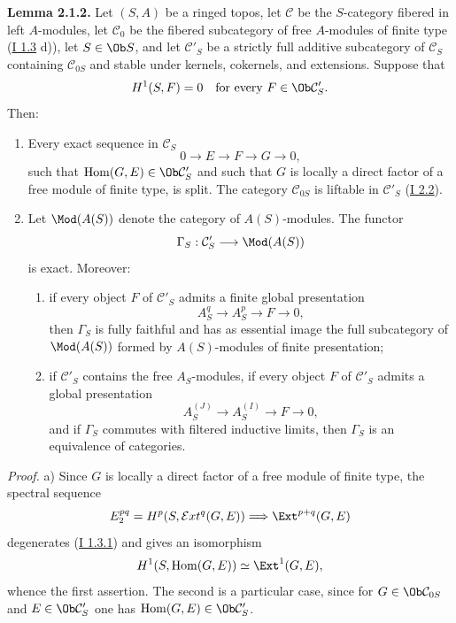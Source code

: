 \textbf{Lemma 2.1.2.} Let $(S,A)$ be a ringed topos, let $\mathcal C$ be the $S$-category fibered in left $A$-modules, let $\mathcal C_0$ be the fibered subcategory of free $A$-modules of finite type (\hyperlink{sga6.e01.sec.1.3}{I 1.3} d)), let $S\in\Ob S$, and let $\mathcal C'_S$ be a strictly full additive subcategory of $\mathcal C_S$ containing $\mathcal C_{0S}$ and stable under kernels, cokernels, and extensions. Suppose that
\[
H^1(S,F)=0\quad\text{for every }F\in\Ob\mathcal C'_S.
\]
Then:
\begin{enumerate}[label=\alph*)]
\item Every exact sequence in $\mathcal C_S$
\[
0\longrightarrow E\longrightarrow F\longrightarrow G\longrightarrow0,
\]
such that $\operatorname{Hom}(G,E)\in\Ob\mathcal C'_S$ and such that $G$ is locally a direct factor of a free module of finite type, is split. The category $\mathcal C_{0S}$ is liftable in $\mathcal C'_S$ (\hyperlink{sga6.e01.prop.2-2}{I 2.2}).
\item Let $\Mod(A(S))$ denote the category of $A(S)$-modules. The functor
\[
\Gamma_S:\mathcal C'_S\longrightarrow\Mod(A(S))
\]
is exact. Moreover:
\begin{enumerate}[label=(\roman*)]
\item if every object $F$ of $\mathcal C'_S$ admits a finite global presentation
\[
A_S^q\longrightarrow A_S^p\longrightarrow F\longrightarrow0,
\]
then $\Gamma_S$ is fully faithful and has as essential image the full subcategory of $\Mod(A(S))$ formed by $A(S)$-modules of finite presentation;
\item if $\mathcal C'_S$ contains the free $A_S$-modules, if every object $F$ of $\mathcal C'_S$ admits a global presentation
\[
A_S^{(J)}\longrightarrow A_S^{(I)}\longrightarrow F\longrightarrow0,
\]
and if $\Gamma_S$ commutes with filtered inductive limits, then $\Gamma_S$ is an equivalence of categories.
\end{enumerate}
\end{enumerate}

\emph{Proof.} a) Since $G$ is locally a direct factor of a free module of finite type, the spectral sequence
\[
E_2^{pq}=H^p(S,\mathcal{E}xt^q(G,E))\Longrightarrow \Ext^{p+q}(G,E)
\]
degenerates (\hyperlink{sga6.e01.lem.1-3-1}{I 1.3.1}) and gives an isomorphism
\[
H^1(S,\operatorname{Hom}(G,E))\simeq \Ext^1(G,E),
\]
whence the first assertion. The second is a particular case, since for $G\in\Ob\mathcal C_{0S}$ and $E\in\Ob\mathcal C'_S$ one has $\operatorname{Hom}(G,E)\in\Ob\mathcal C'_S$.

